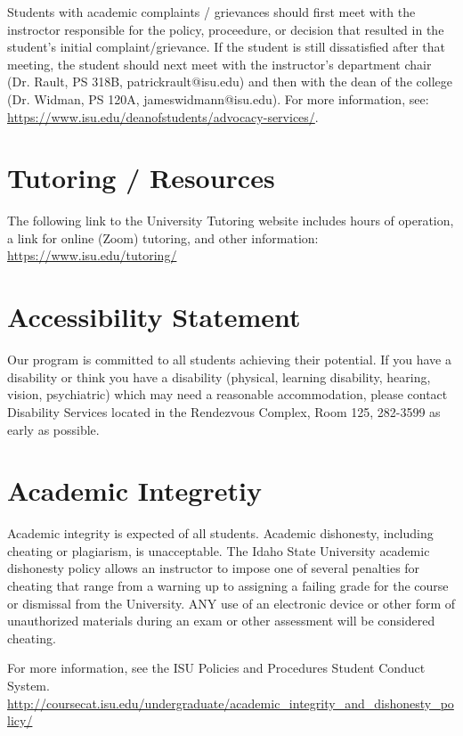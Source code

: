 \documentclass[11pt]{article}\usepackage[]{graphicx}\usepackage[]{xcolor}
\begin{document}
Students with academic complaints / grievances should first meet with the instroctor responsible for the policy, proceedure, or decision that resulted in the student's initial complaint/grievance. If the student is still dissatisfied after that meeting, the student should next meet with the instructor's department chair (Dr. Rault, PS 318B, patrickrault@isu.edu) and then with the dean of the college (Dr. Widman, PS 120A, jameswidmann@isu.edu). For more information, see: \url{https://www.isu.edu/deanofstudents/advocacy-services/}.

\section{Tutoring / Resources}

The following link to the University Tutoring website includes hours of operation, a link for online (Zoom) tutoring, and other information: \url{https://www.isu.edu/tutoring/}

\section{Accessibility Statement}

Our program is committed to all students achieving their potential. 
If you have a disability or think you have a disability (physical, learning disability, hearing, vision, psychiatric) which may need a reasonable accommodation, please contact Disability Services located in the Rendezvous Complex, Room 125, 282-3599 as early as possible.

\section{Academic Integretiy}

Academic integrity is expected of all students. Academic dishonesty, including cheating or plagiarism, is unacceptable. 
The Idaho State University academic dishonesty policy allows an instructor to impose one of several penalties for cheating that range from a warning up to assigning a failing grade for the course or dismissal from the University. 
ANY use of an electronic device or other form of unauthorized materials during an exam or other assessment will be considered cheating. 

For more information, see the ISU Policies and Procedures Student Conduct System.
\url{http://coursecat.isu.edu/undergraduate/academic\_integrity\_and\_dishonesty\_policy/}
\end{document}
